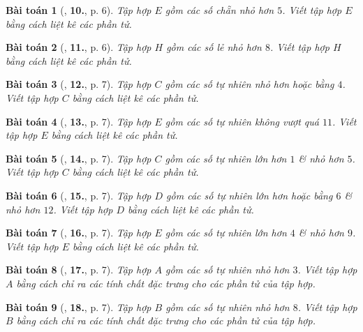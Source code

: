 \documentclass{article}
\numberwithin{equation}{section}
\newtheorem{baitoan}{Bài toán}[section]
\begin{document}
\begin{baitoan}[\cite{Trong_Toan_6_2021}, \textbf{10.}, p. 6]
	Tập hợp $E$ gồm các số chẵn nhỏ hơn $5$. Viết tập hợp $E$ bằng cách liệt kê các phần tử.
\end{baitoan}

\begin{baitoan}[\cite{Trong_Toan_6_2021}, \textbf{11.}, p. 6]
	Tập hợp $H$ gồm các số lẻ nhỏ hơn $8$. Viết tập hợp $H$ bằng cách liệt kê các phần tử.
\end{baitoan}

\begin{baitoan}[\cite{Trong_Toan_6_2021}, \textbf{12.}, p. 7]
	Tập hợp $C$ gồm các số tự nhiên nhỏ hơn hoặc bằng $4$. Viết tập hợp $C$ bằng cách liệt kê các phần tử.
\end{baitoan}

\begin{baitoan}[\cite{Trong_Toan_6_2021}, \textbf{13.}, p. 7]
	Tập hợp $E$ gồm các số tự nhiên không vượt quá $11$. Viết tập hợp $E$ bằng cách liệt kê các phần tử.
\end{baitoan}

\begin{baitoan}[\cite{Trong_Toan_6_2021}, \textbf{14.}, p. 7]
	Tập hợp $C$ gồm các số tự nhiên lớn hơn $1$ \& nhỏ hơn $5$. Viết tập hợp $C$ bằng cách liệt kê các phần tử.
\end{baitoan}

\begin{baitoan}[\cite{Trong_Toan_6_2021}, \textbf{15.}, p. 7]
	Tập hợp $D$ gồm các số tự nhiên lớn hơn hoặc bằng $6$ \& nhỏ hơn $12$. Viết tập hợp $D$ bằng cách liệt kê các phần tử.
\end{baitoan}

\begin{baitoan}[\cite{Trong_Toan_6_2021}, \textbf{16.}, p. 7]
	Tập hợp $E$ gồm các số tự nhiên lớn hơn $4$ \& nhỏ hơn $9$. Viết tập hợp $E$ bằng cách liệt kê các phần tử.
\end{baitoan}

\begin{baitoan}[\cite{Trong_Toan_6_2021}, \textbf{17.}, p. 7]
	Tập hợp $A$ gồm các số tự nhiên nhỏ hơn $3$. Viết tập hợp $A$ bằng cách chỉ ra các tính chất đặc trưng cho các phần tử của tập hợp.
\end{baitoan}

\begin{baitoan}[\cite{Trong_Toan_6_2021}, \textbf{18.}, p. 7]
	Tập hợp $B$ gồm các số tự nhiên nhỏ hơn $8$. Viết tập hợp $B$ bằng cách chỉ ra các tính chất đặc trưng cho các phần tử của tập hợp.
\end{baitoan}
\end{document}
